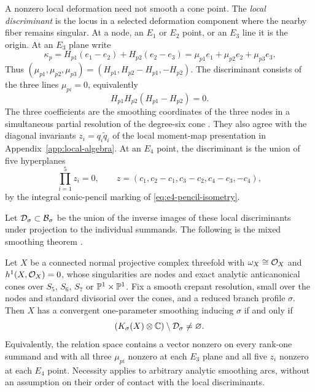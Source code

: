 A nonzero local deformation need not smooth a cone point. The
\emph{local discriminant} is the locus in a selected deformation component
where the nearby fiber remains singular. At a node, an $E_1$ or $E_2$ point, or an
$E_3$ line it is the origin. At an $E_3$ plane write
\begin{equation}
 \kappa_p=H_{p1}(e_1-e_2)+H_{p2}(e_2-e_3)
 =\mu_{p1}e_1+\mu_{p2}e_2+\mu_{p3}e_3.
 \label{eq:e3-three-coefficients}
\end{equation}
Thus $(\mu_{p1},\mu_{p2},\mu_{p3})
=(H_{p1},H_{p2}-H_{p1},-H_{p2})$. The discriminant consists of
the three lines $\mu_{pi}=0$, equivalently
\begin{equation}
 H_{p1}H_{p2}(H_{p1}-H_{p2})=0.
 \label{eq:e3-discriminant}
\end{equation}
The three coefficients are the smoothing coordinates of the three nodes
in a simultaneous partial resolution of the degree-six cone
\cite[Section~3]{Wuebben:2026smoothing}. They also agree with the
diagonal invariants $z_i=q_i\widetilde q_i$ of the local moment-map
presentation in Appendix~\ref{app:local-algebra}.
At an $E_4$ point, the discriminant is the union of five hyperplanes
\begin{equation}
 \prod_{i=1}^5 z_i=0,\qquad
 z=(c_1,c_2-c_1,c_3-c_2,c_4-c_3,-c_4),
 \label{eq:e4-discriminant}
\end{equation}
by the integral conic-pencil marking of \eqref{eq:e4-pencil-isometry}.

Let $\mathcal D_\sigma\subset\mathcal B_\sigma$ be the union of the inverse
images of these local discriminants under projection to the individual
summands. The following is the
mixed smoothing theorem \cite[Theorem~4.7]{Wuebben:2026smoothing}.

\begin{theorem}
\label{thm:all-orders-necessity}
Let $X$ be a connected normal projective complex threefold with
$\omega_X\cong\mathcal O_X$ and $h^1(X,\mathcal O_X)=0$, whose singularities are
nodes and exact analytic anticanonical cones over $S_5$, $S_6$, $S_7$
or $\mathbb P^1\times\mathbb P^1$.
Fix a smooth crepant resolution, small over the nodes and standard
divisorial over the cones, and a reduced branch profile $\sigma$.
Then $X$ has a convergent one-parameter smoothing inducing $\sigma$
if and only if
\begin{equation}
 (K_{\sigma}(X)\otimes\mathbb C)\setminus\mathcal D_\sigma\ne\varnothing.
 \label{eq:exact-smoothing-criterion}
\end{equation}
Equivalently, the relation space contains a vector nonzero on every
rank-one summand and with all three $\mu_{pi}$ nonzero at each $E_3$
plane and all five $z_i$ nonzero at each $E_4$ point. Necessity applies to arbitrary analytic smoothing arcs, without
an assumption on their order of contact with the local discriminants.
\end{theorem}

